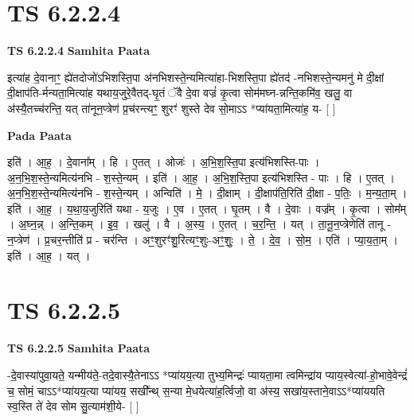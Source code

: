 \documentclass[17pt]{extarticle}
\begin{document}
\section*{ TS 6.2.2.4 }

\textbf{TS 6.2.2.4 } \newline
\textbf{Samhita Paata} \newline

इत्या॑ह दे॒वानाꣳ॒॒ ह्ये॑तदोजो॑ऽभिशस्ति॒पा अ॑नभिशस्ते॒न्यमित्या॑हा-भिशस्ति॒पा ह्ये॑तद॑ -नभिशस्ते॒न्यमनु॑ मे दी॒क्षां दी॒क्षाप॑ति-र्मन्यता॒मित्या॑ह यथाय॒जुरे॒वैतद्-घृ॒तं ॅवै दे॒वा वज्रं॑ कृ॒त्वा सोम॑मघ्न-न्नन्ति॒कमि॑व॒ खलु॒ वा अ॑स्यै॒तच्च॑रन्ति॒ यत् ता॑नून॒प्त्रेण॑ प्र॒च॑रन्त्यꣳ॒॒ शुरꣳ॑ शुस्ते देव सो॒माऽऽ *प्या॑यता॒मित्या॑ह॒ य- [  ] \newline

\textbf{Pada Paata} \newline

इति॑ । आ॒ह॒ । दे॒वाना᳚म् । हि । ए॒तत् । ओजः॑ । अ॒भि॒श॒स्ति॒पा इत्य॑भिशस्ति-पाः । अ॒न॒भि॒श॒स्ते॒न्यमित्य॑नभि - श॒स्ते॒न्यम् । इति॑ । आ॒ह॒ । अ॒भि॒श॒स्ति॒पा इत्य॑भिशस्ति - पाः । हि । ए॒तत् । अ॒न॒भि॒श॒स्ते॒न्यमित्य॑नभि - श॒स्ते॒न्यम् । अन्विति॑ । मे॒ । दी॒क्षाम् । दी॒क्षाप॑ति॒रिति॑ दी॒क्षा - प॒तिः॒ । म॒न्य॒ता॒म् । इति॑ । आ॒ह॒ । य॒था॒य॒जुरिति॑ यथा - य॒जुः । ए॒व । ए॒तत् । घृ॒तम् । वै । दे॒वाः । वज्र᳚म् । कृ॒त्वा । सोम᳚म् । अ॒घ्न॒न्न् । अ॒न्ति॒कम् । इ॒व॒ । खलु॑ । वै । अ॒स्य॒ । ए॒तत् । च॒र॒न्ति॒ । यत् । ता॒नू॒न॒प्त्रेणेति॑ तानू - न॒प्त्रेण॑ । प्र॒चर॒न्तीति॑ प्र - चर॑न्ति । अꣳ॒॒शुरꣳ॑शु॒रित्यꣳ॒॒शुः-अꣳ॒॒शुः॒ । ते॒ । दे॒व॒ । सो॒म॒ । एति॑ । प्या॒य॒ता॒म् । इति॑ । आ॒ह॒ । यत् ।  \newline




\section*{ TS 6.2.2.5 }

\textbf{TS 6.2.2.5 } \newline
\textbf{Samhita Paata} \newline

-दे॒वास्या॑पुवा॒यते॒ यन्मीय॑ते॒-तदे॒वास्यै॒तेनाऽऽ *प्या॑यय॒त्या तुभ्य॒मिन्द्रः॑ प्यायता॒मा त्वमिन्द्रा॑य प्याय॒स्वेत्या॑-हो॒भावे॒वेन्द्रं॑ च॒ सोमं॒ चाऽऽ*प्या॑यय॒त्या प्या॑यय॒ सखी᳚न्थ् स॒न्या मे॒धयेत्या॑ह॒र्त्विजो॒ वा अ॑स्य॒ सखा॑य॒स्ताने॒वाऽऽ*प्या॑ययति स्व॒स्ति ते॑ देव सोम सु॒त्याम॑शी॒ये- [  ] \newline
\end{document}
